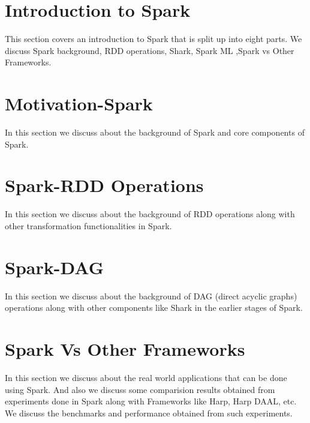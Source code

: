 \section{Introduction to Spark}
\label{c:spark}

This section covers an introduction to Spark that is split up
into eight parts. We discuss Spark background, RDD operations,
Shark, Spark ML ,Spark vs Other Frameworks.

\section{Motivation-Spark}
\label{s:motivation-spark}

In this section we discuss about the background of Spark and
core components of Spark.

\section{Spark-RDD Operations}

In this section we discuss about the background of RDD operations
along with other transformation functionalities in Spark.

\section{Spark-DAG}

In this section we discuss about the background of DAG (direct acyclic
graphs) operations along with other components like Shark in the
earlier stages of Spark.

\section{Spark Vs Other Frameworks}

In this section we discuss about the real world applications that can
be done using Spark.  And also we discuss some comparision results
obtained from experiments done in Spark along with Frameworks like
Harp, Harp DAAL, etc. We discuss the benchmarks and performance
obtained from such experiments.


